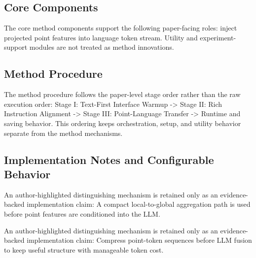 \subsection{Core Components}
The core method components support the following paper-facing roles: inject projected point features into language token stream. Utility and experiment-support modules are not treated as method innovations.

\subsection{Method Procedure}
The method procedure follows the paper-level stage order rather than the raw execution order: Stage I: Text-First Interface Warmup -> Stage II: Rich Instruction Alignment -> Stage III: Point-Language Transfer -> Runtime and saving behavior. This ordering keeps orchestration, setup, and utility behavior separate from the method mechanisms.

\subsection{Implementation Notes and Configurable Behavior}
An author-highlighted distinguishing mechanism is retained only as an evidence-backed implementation claim: A compact local-to-global aggregation path is used before point features are conditioned into the LLM.

An author-highlighted distinguishing mechanism is retained only as an evidence-backed implementation claim: Compress point-token sequences before LLM fusion to keep useful structure with manageable token cost.
